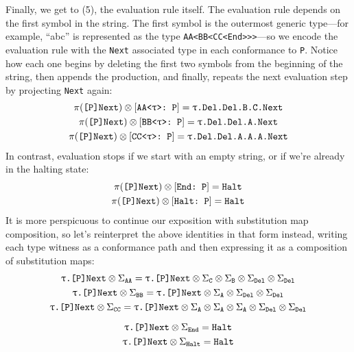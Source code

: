 \documentclass[../generics]{subfiles}
\begin{document}
Finally, we get to (5), the evaluation rule itself. The evaluation rule depends on the first symbol in the string. The first symbol is the outermost generic type---for example, ``abc'' is represented as the type \texttt{AA<BB<CC<End>>>}---so we encode the evaluation rule with the \texttt{Next} associated type in each conformance to \texttt{P}. Notice how each one begins by deleting the first two symbols from the beginning of the string, then appends the production, and finally, repeats the next evaluation step by projecting \texttt{Next} again:
\begin{gather*}
\pi(\texttt{[P]Next}) \otimes [\texttt{AA<$\uptau$>:~P}] = \texttt{$\uptau$.Del.Del.B.C.Next}\\
\pi(\texttt{[P]Next}) \otimes [\texttt{BB<$\uptau$>:~P}] = \texttt{$\uptau$.Del.Del.A.Next}\\
\pi(\texttt{[P]Next}) \otimes [\texttt{CC<$\uptau$>:~P}] = \texttt{$\uptau$.Del.Del.A.A.A.Next}
\end{gather*}
In contrast, evaluation stops if we start with an empty string, or if we're already in the halting state:
\begin{gather*}
\pi(\texttt{[P]Next}) \otimes [\texttt{End:~P}] = \texttt{Halt}\\
\pi(\texttt{[P]Next}) \otimes [\texttt{Halt:~P}] = \texttt{Halt}
\end{gather*}
It is more perspicuous to continue our exposition with substitution map composition, so let's reinterpret the above identities in that form instead, writing each type witness as a conformance path and then expressing it as a composition of substitution maps:
\begin{gather*}
\texttt{$\uptau$.[P]Next} \otimes \Sigma_{\texttt{AA}} = \texttt{$\uptau$.[P]Next} \otimes \Sigma_{\texttt{C}} \otimes \Sigma_{\texttt{B}} \otimes \Sigma_{\texttt{Del}} \otimes \Sigma_{\texttt{Del}}\\
\texttt{$\uptau$.[P]Next} \otimes \Sigma_{\texttt{BB}} = \texttt{$\uptau$.[P]Next} \otimes \Sigma_{\texttt{A}} \otimes \Sigma_{\texttt{Del}} \otimes \Sigma_{\texttt{Del}}\\
\texttt{$\uptau$.[P]Next} \otimes \Sigma_{\texttt{CC}} = \texttt{$\uptau$.[P]Next} \otimes \Sigma_{\texttt{A}} \otimes \Sigma_{\texttt{A}} \otimes \Sigma_{\texttt{A}} \otimes \Sigma_{\texttt{Del}} \otimes \Sigma_{\texttt{Del}}\\[\medskipamount]
\texttt{$\uptau$.[P]Next} \otimes \Sigma_{\texttt{End}} = \texttt{Halt}\\
\texttt{$\uptau$.[P]Next} \otimes \Sigma_{\texttt{Halt}} = \texttt{Halt}
\end{gather*}
\end{document}
